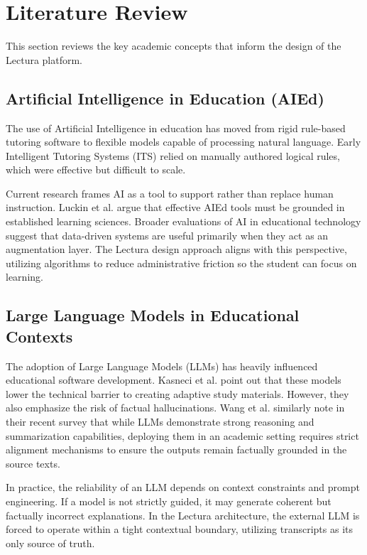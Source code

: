\section{Literature Review}
This section reviews the key academic concepts that inform the design of the Lectura platform.

\subsection{Artificial Intelligence in Education (AIEd)}
The use of Artificial Intelligence in education has moved from rigid rule-based tutoring software to flexible models capable of processing natural language. Early Intelligent Tutoring Systems (ITS) relied on manually authored logical rules, which were effective but difficult to scale. 

Current research frames AI as a tool to support rather than replace human instruction. Luckin et al. \cite{luckin2016intelligence} argue that effective AIEd tools must be grounded in established learning sciences. Broader evaluations of AI in educational technology \cite{kazim2024ai} suggest that data-driven systems are useful primarily when they act as an augmentation layer. The Lectura design approach aligns with this perspective, utilizing algorithms to reduce administrative friction so the student can focus on learning.

\subsection{Large Language Models in Educational Contexts}
The adoption of Large Language Models (LLMs) has heavily influenced educational software development. Kasneci et al. \cite{kasneci2023chatgpt} point out that these models lower the technical barrier to creating adaptive study materials. However, they also emphasize the risk of factual hallucinations. Wang et al. \cite{wang2024large} similarly note in their recent survey that while LLMs demonstrate strong reasoning and summarization capabilities, deploying them in an academic setting requires strict alignment mechanisms to ensure the outputs remain factually grounded in the source texts.

In practice, the reliability of an LLM depends on context constraints and prompt engineering. If a model is not strictly guided, it may generate coherent but factually incorrect explanations. In the Lectura architecture, the external LLM is forced to operate within a tight contextual boundary, utilizing transcripts as its only source of truth.

